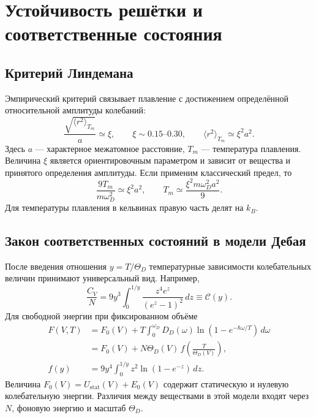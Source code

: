 \documentclass[../final.tex]{subfiles}
\begin{document}
\clearpage
\section{Устойчивость решётки и соответственные состояния}
\subsection{Критерий Линдемана}
Эмпирический критерий связывает плавление с достижением определённой
относительной амплитуды колебаний:
\begin{equation*}
 \frac{\sqrt{\langle r^2\rangle_{T_m}}}{a}\simeq\xi,
 \qquad \xi\sim0.15\text{--}0.30,
 \qquad \langle r^2\rangle_{T_m}\simeq\xi^2a^2.
\end{equation*}
Здесь $a$ --- характерное межатомное расстояние, $T_m$ --- температура плавления.
Величина $\xi$ является ориентировочным параметром и зависит от вещества
и принятого определения амплитуды.
Если применим классический предел, то
\begin{equation*}
 \frac{9T_m}{m\omega_D^2}\simeq\xi^2a^2,
 \qquad T_m\simeq\frac{\xi^2m\omega_D^2a^2}{9}.
\end{equation*}
Для температуры плавления в кельвинах правую часть делят на $k_B$.

\subsection{Закон соответственных состояний в модели Дебая}
После введения отношения $y=T/\Theta_D$ температурные зависимости
колебательных величин принимают универсальный вид.
Например,
\begin{equation*}
 \frac{C_V}{N}=9y^3\int_0^{1/y}\frac{z^4e^z}{(e^z-1)^2}\,dz
 \equiv\mathcal C(y).
\end{equation*}
Для свободной энергии при фиксированном объёме
\begin{align*}
 F(V,T)&=F_0(V)+T\int_0^{\omega_D}D_D(\omega)
 \ln(1-e^{-\hbar\omega/T})\,d\omega\\
 &=F_0(V)+N\Theta_D(V)\,f\!\left(\frac{T}{\Theta_D(V)}\right),\\
 f(y)&=9y^4\int_0^{1/y}z^2\ln(1-e^{-z})\,dz.
\end{align*}
Величина $F_0(V)=U_{\mathrm{stat}}(V)+E_0(V)$ содержит статическую
и нулевую колебательную энергии.
Различия между веществами в этой модели входят через $N$,
фоновую энергию и масштаб $\Theta_D$.
\end{document}

